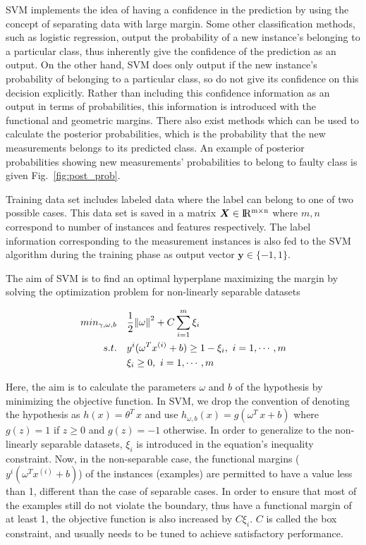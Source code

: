 SVM implements the idea of having a confidence in the prediction by using the concept of separating data with large margin. 
Some other classification methods, such as logistic regression, output the probability of a new instance's belonging to a particular class, thus inherently give the confidence of the prediction as an output. 
On the other hand, SVM does only output if the new instance's probability of belonging to a particular class, so do not give its confidence on this decision explicitly. 
Rather than including this confidence information as an output in terms of probabilities, this information is introduced with the functional and geometric margins. 
There also exist methods which can be used to calculate the posterior probabilities, which is the probability that the new measurements belongs to its predicted class\cite{platt1999probabilistic}. 
An example of posterior probabilities showing new measurements' probabilities to belong to faulty class is given Fig.~\ref{fig:post_prob}. 

Training data set includes labeled data where the label can belong to one of two possible cases. This data set is saved in a matrix $\bm{X} \in {\rm I\!R^{m \times n}}  $ where $m,n$ correspond to number of instances and features respectively. The label information corresponding to the measurement instances is also fed to the SVM algorithm during the training phase as output vector $\bm{y} \in \{-1,1\}$. 

The aim of SVM is to find an optimal hyperplane maximizing the margin by solving the optimization problem for non-linearly separable datasets

\begin{align}
min_{\gamma,\omega,b} \quad & \frac{1}{2} \norm{\omega}^2 + C \sum\limits_{i = 1}^m \xi_i \\
s.t. \quad & y^{i}(\omega^T x^{(i)} + b) \geq 1 - \xi_i, \ i = 1, \cdots, m\\
 & \xi_i \geq 0, \ i = 1, \cdots, m
\end{align}

Here, the aim is to calculate the parameters $\omega$ and $b$ of the hypothesis by minimizing the objective function. In SVM, we drop the convention of denoting the hypothesis as $h(x)= \theta^T \, x$ and use $h_{\omega,b}(x)=g(\omega^T \, x + b)$ where $g(z) = 1$ if $z\geq0$ and $g(z)=-1$ otherwise. In order to generalize to the non-linearly separable datasets, $\xi_i$ is introduced in the equation's inequality constraint. Now, in the non-separable case, the functional margins ($y^{i}(\omega^T x^{(i)} + b)$) of the instances (examples) are permitted to have a value less than 1, different than the case of separable cases. In order to ensure that most of the examples still do not violate the boundary, thus have a functional margin of at least 1, the objective function is also increased by $C \xi_i$. $C$ is called the box constraint, and usually needs to be tuned to achieve satisfactory performance.

